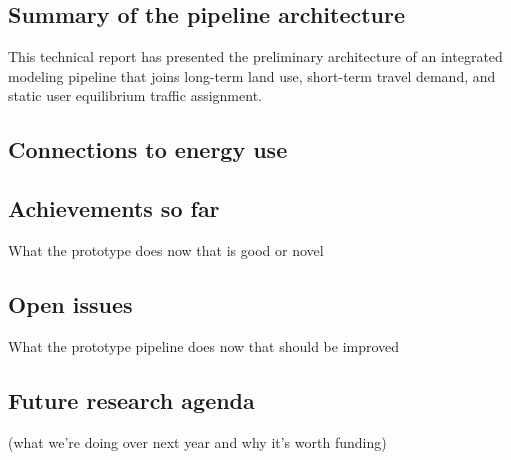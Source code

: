 \subsection{Summary of the pipeline architecture}

This technical report has presented the preliminary architecture of an integrated modeling pipeline that joins long-term land use, short-term travel demand, and static user equilibrium traffic assignment.


\subsection{Connections to energy use}



\subsection{Achievements so far}

What the prototype does now that is good or novel

\subsection{Open issues}

What the prototype pipeline does now that should be improved




\subsection{Future research agenda}

(what we’re doing over next year and why it’s worth funding)